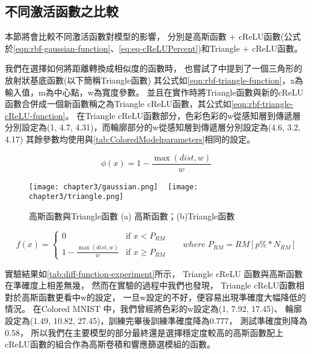 \documentclass[class=NCU\_thesis, crop=false]{standalone}
\begin{document}
    \subsection{不同激活函數之比較}
    \label{chapter:diff-rbf-compare}
    本節將會比較不同激活函數對模型的影響，
    分別是高斯函數 + cReLU函數(公式於\cref{eqn:rbf-gaussian-function}、\cref{eq:eq-cReLUPercent})和Triangle + cReLU函數。

    我們在選擇如何將距離轉換成相似度的函數時，
    也嘗試了\cite{YangCNNInterpretable}中提到了一個三角形的放射狀基底函數(以下簡稱Triangle函數)
    其公式如\cref{eqn:rbf-triangle-function}，x為輸入值，m為中心點，w為寬度參數。
    並且在實作時將Triangle函數與新的cReLU函數合併成一個新函數稱之為Triangle cReLU函數，其公式如\cref{eqn:rbf-triangle-cReLU-function}。
    在Triangle cReLU函數部分，色彩色彩的w從感知層到傳遞層分別設定為(1, 4.7, 4.31)，而輪廓部分的w從感知層到傳遞層分別設定為(4.6, 3.2, 4.17)
    其餘參數均使用與\cref{tab:ColoredModelparameters}相同的設定。

    \begin{equation}
          \label{eqn:rbf-triangle-function}
          \phi (x) = 1 - \frac{ \max \left( dist, w \right)}{w}
    \end{equation}

    \begin{figure}[H]
        \centering
        \subcaptionbox
            {
            \label{fig:gaussian}}
            {\texttt{[image: chapter3/gaussian.png]}}
        ~
        \subcaptionbox
            {
            \label{fig:triangle}}
            {\texttt{[image: chapter3/triangle.png]}}
        \caption{高斯函數與Triangle函數\cite{YangCNNInterpretable} (a) 高斯函數；(b)Triangle函數}
        \label{fig:rbf}
    \end{figure}

    \begin{equation}
      \label{eqn:rbf-triangle-cReLU-function}
      f(x)= 
      \begin{cases}
            0 & \text{if  $x < P_{RM}$ }\\
            1 - \frac{ \max \left(dist, w \right)}{w} & \text{if  $x \geq P_{RM}$}
       \end{cases} \quad where \; P_{RM} = RM\left[ p\% * N_{RM} \right]
    \end{equation}

    實驗結果如\cref{tab:diff-function-experiment}所示，
    Triangle cReLU 函數與高斯函數在準確度上相差無幾，
    然而在實驗的過程中我們也發現，
    Triangle cReLU函數相對於高斯函數更看中w的設定，
    一旦w設定的不好，便容易出現準確度大幅降低的情況。
    在Colored MNIST 中，我們曾經將色彩的w設定為(1, 7.92, 17.45)、
    輪廓設定為(1.49, 10.82, 27.45)，訓練完畢後訓練準確度降為0.777，
    測試準確度則降為0.58，
    所以我們在主要模型的部分最終還是選擇穩定度較高的高斯函數配上cReLU函數的組合作為高斯卷積和響應篩選模組的函數。
\end{document}
